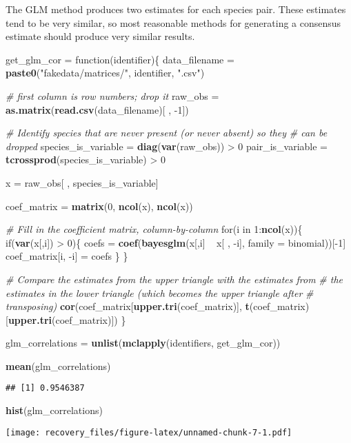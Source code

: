 \documentclass[11pt,]{article}
\newenvironment{Shaded}{\begin{snugshade}}{\end{snugshade}}
\newcommand{\KeywordTok}[1]{\textcolor[rgb]{0.13,0.29,0.53}{\textbf{{#1}}}}
\newcommand{\DataTypeTok}[1]{\textcolor[rgb]{0.13,0.29,0.53}{{#1}}}
\newcommand{\DecValTok}[1]{\textcolor[rgb]{0.00,0.00,0.81}{{#1}}}
\newcommand{\StringTok}[1]{\textcolor[rgb]{0.31,0.60,0.02}{{#1}}}
\newcommand{\CommentTok}[1]{\textcolor[rgb]{0.56,0.35,0.01}{\textit{{#1}}}}
\newcommand{\NormalTok}[1]{{#1}}
\begin{document}
The GLM method produces two estimates for each species pair. These
estimates tend to be very similar, so most reasonable methods for
generating a consensus estimate should produce very similar results.

\begin{Shaded}
\begin{Highlighting}[]
\NormalTok{get_glm_cor =}\StringTok{ }\NormalTok{function(identifier)\{}
  \NormalTok{data_filename =}\StringTok{ }\KeywordTok{paste0}\NormalTok{(}\StringTok{"fakedata/matrices/"}\NormalTok{, identifier, }\StringTok{".csv"}\NormalTok{)}
  
  \CommentTok{# first column is row numbers; drop it}
  \NormalTok{raw_obs =}\StringTok{ }\KeywordTok{as.matrix}\NormalTok{(}\KeywordTok{read.csv}\NormalTok{(data_filename)[ , -}\DecValTok{1}\NormalTok{])}
  
  \CommentTok{# Identify species that are never present (or never absent) so they }
  \CommentTok{# can be dropped}
  \NormalTok{species_is_variable =}\StringTok{ }\KeywordTok{diag}\NormalTok{(}\KeywordTok{var}\NormalTok{(raw_obs)) >}\StringTok{ }\DecValTok{0}
  \NormalTok{pair_is_variable =}\StringTok{ }\KeywordTok{tcrossprod}\NormalTok{(species_is_variable) >}\StringTok{ }\DecValTok{0}
  
  
  \NormalTok{x =}\StringTok{ }\NormalTok{raw_obs[ , species_is_variable]}
  
  \NormalTok{coef_matrix =}\StringTok{ }\KeywordTok{matrix}\NormalTok{(}\DecValTok{0}\NormalTok{, }\KeywordTok{ncol}\NormalTok{(x), }\KeywordTok{ncol}\NormalTok{(x))}
  
  \CommentTok{# Fill in the coefficient matrix, column-by-column}
  \NormalTok{for(i in }\DecValTok{1}\NormalTok{:}\KeywordTok{ncol}\NormalTok{(x))\{}
    \NormalTok{if(}\KeywordTok{var}\NormalTok{(x[,i]) >}\StringTok{ }\DecValTok{0}\NormalTok{)\{}
      \NormalTok{coefs =}\StringTok{ }\KeywordTok{coef}\NormalTok{(}\KeywordTok{bayesglm}\NormalTok{(x[,i] ~}\StringTok{ }\NormalTok{x[ , -i], }\DataTypeTok{family =} \NormalTok{binomial))[-}\DecValTok{1}\NormalTok{]}
      \NormalTok{coef_matrix[i, -i] =}\StringTok{ }\NormalTok{coefs}
    \NormalTok{\}}
  \NormalTok{\}}
  
  \CommentTok{# Compare the estimates from the upper triangle with the estimates from }
  \CommentTok{# the estimates in the lower triangle (which becomes the upper triangle after }
  \CommentTok{# transposing)}
  \KeywordTok{cor}\NormalTok{(coef_matrix[}\KeywordTok{upper.tri}\NormalTok{(coef_matrix)], }\KeywordTok{t}\NormalTok{(coef_matrix)[}\KeywordTok{upper.tri}\NormalTok{(coef_matrix)])}
\NormalTok{\}}

\NormalTok{glm_correlations =}\StringTok{ }\KeywordTok{unlist}\NormalTok{(}\KeywordTok{mclapply}\NormalTok{(identifiers, get_glm_cor))}

\KeywordTok{mean}\NormalTok{(glm_correlations)}
\end{Highlighting}
\end{Shaded}

\begin{verbatim}
## [1] 0.9546387
\end{verbatim}

\begin{Shaded}
\begin{Highlighting}[]
\KeywordTok{hist}\NormalTok{(glm_correlations)}
\end{Highlighting}
\end{Shaded}

\texttt{[image: recovery\_files/figure-latex/unnamed-chunk-7-1.pdf]}
\end{document}
